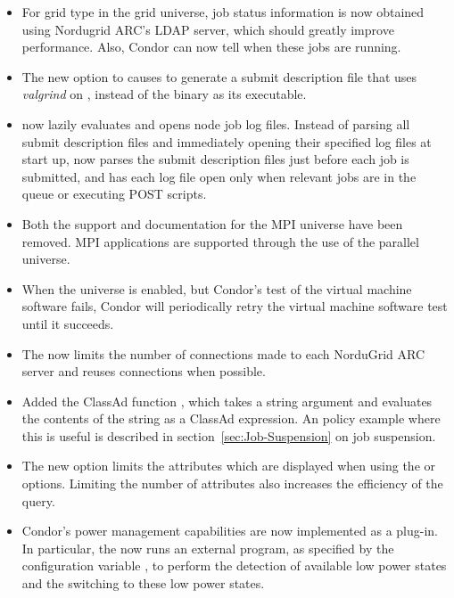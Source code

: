 \begin{itemize}
\item For grid type  in the grid universe,
job status information
is now obtained using Nordugrid ARC's LDAP server, which should greatly
improve performance. Also, Condor can now tell when these jobs are running.

\item The new  option to 
causes  to generate a submit description file that
uses \emph{valgrind} on , instead of the 
binary as its executable.

\item {} now lazily evaluates and opens node job log files.
Instead of parsing all submit description files and 
immediately opening their specified log files at start up,
 now parses
the submit description files just before each job is submitted,
and has each log file open only when relevant jobs are in the queue
or executing POST scripts.

\item Both the support and documentation for the MPI universe have been removed.
MPI applications are supported through the use of the parallel universe.

\item When the  universe is enabled,
but Condor's test of the virtual machine software fails,
Condor will periodically retry the virtual machine software test until it
succeeds.

\item The  now limits the number of connections
made to each NorduGrid ARC server and reuses connections when possible.

\item Added the ClassAd function , which takes a string
argument and evaluates the contents of the string as a ClassAd
expression.  An policy example where this is useful is described in
section~\ref{sec:Job-Suspension} on job suspension.

\item The new  option  limits the
attributes which are displayed when using the  or 
options.
Limiting the number of attributes also increases the efficiency of the query.

\item Condor's power management capabilities are now implemented as a
  plug-in.  In particular, the  now runs an
  external program, as specified by the configuration variable
  ,
  to perform the detection of available low power states and the
  switching to these low power states.


\end{itemize}
